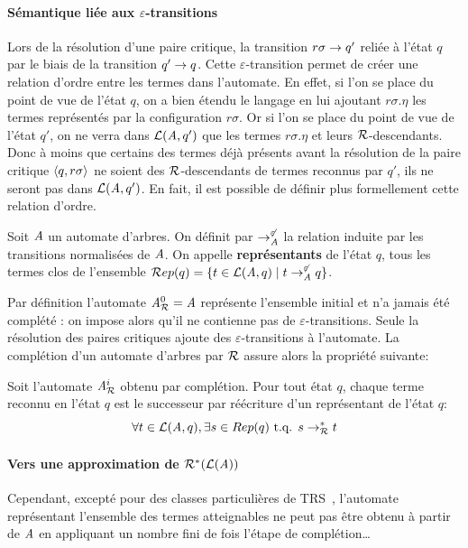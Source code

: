 \paragraph{Sémantique liée aux $\varepsilon$-transitions}
Lors de la résolution d'une paire critique, la transition $r\sigma \rightarrow q'$ reliée à l'état $q$ par le biais de la transition
$q' \rightarrow q$. Cette $\varepsilon$-transition permet de créer une relation d'ordre entre les termes dans l'automate.
En effet, si l'on se place du point de vue de l'état $q$, on a bien étendu le langage en lui ajoutant $r\sigma.\eta$
les termes représentés par la configuration $r\sigma$. Or si l'on se place du point de vue de l'état $q'$, on ne verra dans $\mathcal{L}(\mathit A,q')$
que les termes $r\sigma.\eta$ et leurs $\mathcal R$-descendants. Donc à moins que certains des termes déjà présents avant la résolution
de la paire critique $\langle q, r\sigma\rangle$ ne soient des $\mathcal R$-descendants de termes reconnus par $q'$, ils ne seront pas dans $\mathcal{L}(\mathit A, q')$.
En fait, il est possible de définir plus formellement cette relation d'ordre.
\begin{definition}
  \label{def:representants}
  Soit $\mathit A$ un automate d'arbres. On définit par $\rightarrow^{\not\varepsilon}_\mathit A$ la relation induite par les transitions normalisées de $\mathit A$.
  On appelle \textbf{représentants} de l'état $q$, tous les termes clos de l'ensemble $\mathcal R ep(q) = \{t \in \mathcal{L}(\mathit A, q)\; | \; t \rightarrow^{\not\varepsilon}_\mathit A q\}$.
\end{definition}

Par définition l'automate ${\mathit A}_{\mathcal R}^0 = \mathit A$ représente l'ensemble initial et n'a jamais été complété : on impose alors qu'il ne contienne pas 
de $\varepsilon$-transitions. Seule la résolution des paires critiques ajoute des $\varepsilon$-transitions à l'automate.
La complétion d'un automate d'arbres par $\mathcal R$ assure alors la propriété suivante:


\begin{property}
  Soit l'automate ${\mathit A}_{\mathcal R}^i$ obtenu par complétion. Pour tout état $q$, 
  chaque terme reconnu en l'état $q$ est le successeur par réécriture d'un représentant 
  de l'état $q$:
  \[\forall t \in \mathcal{L}(\mathit A, q), \exists s \in Rep(q) \mbox{ t.q. } s \rightarrow_\mathcal R^* t\]
\end{property}



\paragraph{Vers une approximation de $\mathcal R^*(\mathcal{L}(\mathit A))$}


Cependant, excepté pour des classes particulières de TRS~\cite{FeuilladeGVTT-JAR04,Genet-Habil},
l'automate représentant l'ensemble des termes atteignables ne peut pas être obtenu
à partir de $\mathit A$ en appliquant un nombre fini de fois l'étape de complétion\dots


